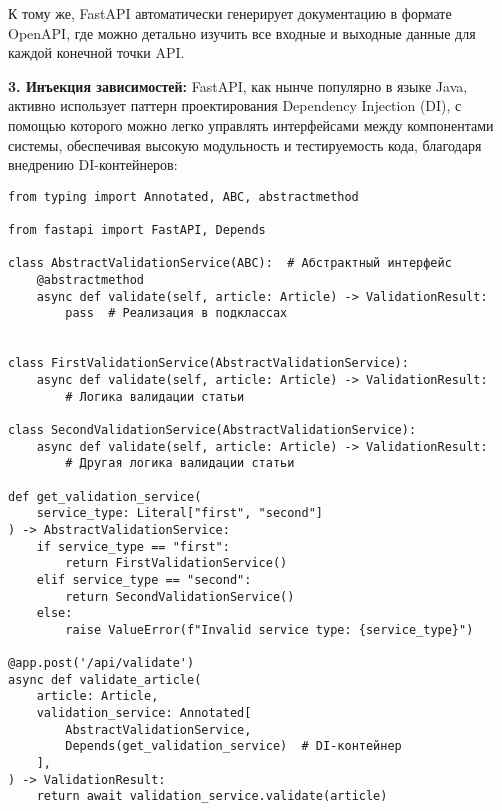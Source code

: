 К тому же, FastAPI автоматически генерирует документацию в формате OpenAPI,
где можно детально изучить все входные и выходные данные для каждой конечной точки API.

\textbf{3. Инъекция зависимостей:}
FastAPI, как нынче популярно в языке Java, активно использует паттерн проектирования Dependency Injection (DI),
с помощью которого можно легко управлять интерфейсами между компонентами системы, обеспечивая высокую модульность 
и тестируемость кода, благодаря внедрению DI-контейнеров:

\begin{verbatim}
from typing import Annotated, ABC, abstractmethod

from fastapi import FastAPI, Depends

class AbstractValidationService(ABC):  # Абстрактный интерфейс
    @abstractmethod
    async def validate(self, article: Article) -> ValidationResult:
        pass  # Реализация в подклассах


class FirstValidationService(AbstractValidationService):
    async def validate(self, article: Article) -> ValidationResult:
        # Логика валидации статьи

class SecondValidationService(AbstractValidationService):
    async def validate(self, article: Article) -> ValidationResult:
        # Другая логика валидации статьи

def get_validation_service(
    service_type: Literal["first", "second"]
) -> AbstractValidationService:
    if service_type == "first":
        return FirstValidationService()
    elif service_type == "second":
        return SecondValidationService()
    else:
        raise ValueError(f"Invalid service type: {service_type}")

@app.post('/api/validate')
async def validate_article(
    article: Article,
    validation_service: Annotated[
        AbstractValidationService, 
        Depends(get_validation_service)  # DI-контейнер
    ],
) -> ValidationResult:
    return await validation_service.validate(article)
\end{verbatim}

			
	

